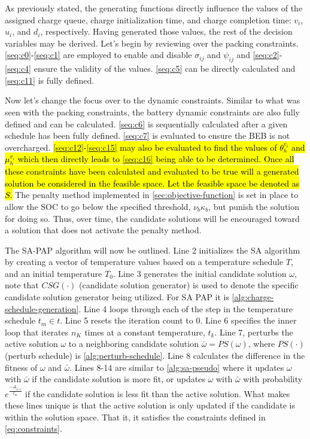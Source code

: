 \documentclass[11pt,a4paper,final]{article}
\newcommand{\Tau}{T}                        %
\begin{document}
As previously stated, the generating functions directly influence the values of the assigned charge queue, charge
initialization time, and charge completion time: \(v_i\), \(u_i\), and \(d_i\), respectively. Having generated those values,
the rest of the decision variables may be derived. Let's begin by reviewing over the packing constraints.
\ref{seq:c0}-\ref{seq:c1} are employed to enable and disable \(\sigma_{ij}\) and \(\psi_{ij}\) and \ref{seq:c2}-\ref{seq:c4} ensure
the validity of the values. \ref{seq:c5} can be directly calculated and \ref{seq:c11} is fully defined.

Now let's change the focus over to the dynamic constraints. Similar to what was seen with the packing constraints, the
battery dynamic constraints are also fully defined and can be calculated. \ref{seq:c6} is sequentially calculated after
a given schedule has been fully defined. \ref{seq:c7} is evaluated to ensure the BEB is not overcharged. \hl{{\ref{seq:c12}}-{\ref{seq:c15}} may also be evaluated to find the values of $\theta_h^{v_i}$ and $\mu_h^{v_i}$ which then directly leads to {\ref{seq:c16}} being able to be determined. Once all these constraints have been calculated and evaluated to be true will a generated solution be considered in the feasible space. Let the feasible space be denoted as $S$.} The penalty method implemented in \ref{sec:objective-function} is set in place to allow the SOC to go below the
specified threshold, \(\nu_b \kappa_b\), but punish the solution for doing so. Thus, over time, the candidate solutions will be
encouraged toward a solution that does not activate the penalty method.

The SA-PAP algorithm will now be outlined. Line 2 initializes the SA algorithm by creating a vector of temperature
values based on a temperature schedule \(\Tau\), and an initial temperature \(\Tau_0\). Line 3 generates the initial
candidate solution \(\omega\), note that \(CSG(\cdot)\) (candidate solution generator) is used to denote the specific candidate
solution generator being utilized. For SA PAP it is \ref{alg:charge-schedule-generation}. Line 4 loops through each of
the step in the temperature schedule \(t_m \in t\). Line 5 resets the iteration count to 0. Line 6 specifies the inner loop
that iterates \(n_K\) times at a constant temperature, \(t_k\). Line 7, perturbs the active solution \(\omega\) to a neighboring
candidate solution \(\bar{\omega} = PS(\omega)\), where \(PS(\cdot)\) (perturb schedule) is \ref{alg:perturb-schedule}. Line 8 calculates
the difference in the fitness of \(\omega\) and \(\bar{\omega}\). Lines 8-14 are similar to \ref{alg:sa-pseudo} where it updates \(\omega\)
with \(\bar{\omega}\) if the candidate solution is more fit, or updates \(\omega\) with \(\bar{\omega}\) with probability
\(e^{\frac{-\Delta_{\bar{\omega},\omega}}{t_m}}\) if the candidate solution is less fit than the active solution. What makes these lines
unique is that the active solution is only updated if the candidate is within the solution space. That it, it satisfies
the constraints defined in \ref{eq:constraints}.
\end{document}
